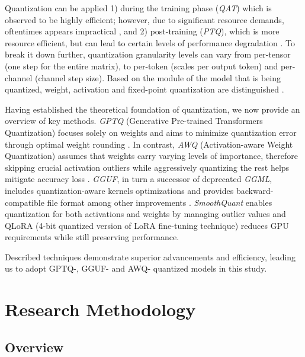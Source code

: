 \documentclass[conference]{IEEEtran}
\begin{document}
Quantization can be applied 1) during the training phase (\textit{QAT}) which is observed to be highly efficient; however, due to significant resource demands, oftentimes appears impractical \cite{chen2024EfficientQAT}, and 2) post-training (\textit{PTQ}), which is more resource efficient, but can lead to certain levels of performance degradation \cite{shen2024exploring}. To break it down further, quantization granularity levels can vary from per-tensor (one step for the entire matrix), to per-token  (scales per output token) and per-channel (channel step size)\cite{shen2024exploring}. Based on the module of the model that is being quantized, weight, activation and fixed-point quantization are distinguished \cite{bai2024beyond}.

Having established the theoretical foundation of quantization, we now provide an overview of key methods. \textit{GPTQ} (Generative Pre-trained Transformers Quantization) focuses solely on weights and aims to minimize quantization error through optimal weight rounding \cite{frantar2023GPTQ}. In contrast, \textit{AWQ} (Activation-aware Weight Quantization) assumes that weights carry varying levels of importance, therefore skipping crucial activation outliers while aggressively quantizing the rest helps mitigate accuracy loss \cite{lin2024AWQ}. \textit{GGUF}, in turn a successor of deprecated \textit{GGML}, includes  quantization-aware kernels optimizations and  provides backward-compatible file format among other improvements \cite{rajput2024benchmarking}. \textit{SmoothQuant} \cite{xiao2023SmoothQuant} enables quantization for both activations and weights by managing outlier values and QLoRA (4-bit quantized version of LoRA fine-tuning technique) \cite{dettmers2023qlora} reduces GPU requirements while still preserving performance.

Described techniques demonstrate superior advancements and efficiency, leading us to adopt GPTQ-, GGUF- and AWQ- quantized models in this study.

\section{Research Methodology}\label{method}

\subsection{Overview}

\end{document}
